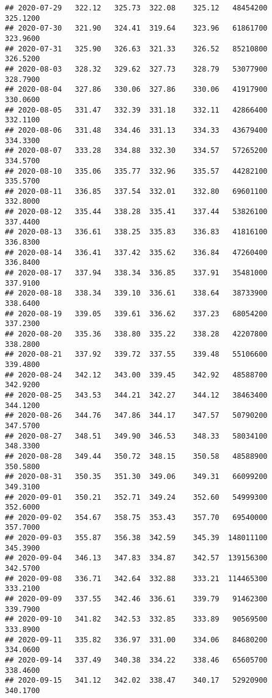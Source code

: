 \documentclass[
]{article}
\begin{document}
\begin{verbatim}
## 2020-07-29   322.12   325.73  322.08    325.12   48454200     325.1200
## 2020-07-30   321.90   324.41  319.64    323.96   61861700     323.9600
## 2020-07-31   325.90   326.63  321.33    326.52   85210800     326.5200
## 2020-08-03   328.32   329.62  327.73    328.79   53077900     328.7900
## 2020-08-04   327.86   330.06  327.86    330.06   41917900     330.0600
## 2020-08-05   331.47   332.39  331.18    332.11   42866400     332.1100
## 2020-08-06   331.48   334.46  331.13    334.33   43679400     334.3300
## 2020-08-07   333.28   334.88  332.30    334.57   57265200     334.5700
## 2020-08-10   335.06   335.77  332.96    335.57   44282100     335.5700
## 2020-08-11   336.85   337.54  332.01    332.80   69601100     332.8000
## 2020-08-12   335.44   338.28  335.41    337.44   53826100     337.4400
## 2020-08-13   336.61   338.25  335.83    336.83   41816100     336.8300
## 2020-08-14   336.41   337.42  335.62    336.84   47260400     336.8400
## 2020-08-17   337.94   338.34  336.85    337.91   35481000     337.9100
## 2020-08-18   338.34   339.10  336.61    338.64   38733900     338.6400
## 2020-08-19   339.05   339.61  336.62    337.23   68054200     337.2300
## 2020-08-20   335.36   338.80  335.22    338.28   42207800     338.2800
## 2020-08-21   337.92   339.72  337.55    339.48   55106600     339.4800
## 2020-08-24   342.12   343.00  339.45    342.92   48588700     342.9200
## 2020-08-25   343.53   344.21  342.27    344.12   38463400     344.1200
## 2020-08-26   344.76   347.86  344.17    347.57   50790200     347.5700
## 2020-08-27   348.51   349.90  346.53    348.33   58034100     348.3300
## 2020-08-28   349.44   350.72  348.15    350.58   48588900     350.5800
## 2020-08-31   350.35   351.30  349.06    349.31   66099200     349.3100
## 2020-09-01   350.21   352.71  349.24    352.60   54999300     352.6000
## 2020-09-02   354.67   358.75  353.43    357.70   69540000     357.7000
## 2020-09-03   355.87   356.38  342.59    345.39  148011100     345.3900
## 2020-09-04   346.13   347.83  334.87    342.57  139156300     342.5700
## 2020-09-08   336.71   342.64  332.88    333.21  114465300     333.2100
## 2020-09-09   337.55   342.46  336.61    339.79   91462300     339.7900
## 2020-09-10   341.82   342.53  332.85    333.89   90569500     333.8900
## 2020-09-11   335.82   336.97  331.00    334.06   84680200     334.0600
## 2020-09-14   337.49   340.38  334.22    338.46   65605700     338.4600
## 2020-09-15   341.12   342.02  338.47    340.17   52920900     340.1700
\end{verbatim}
\end{document}
